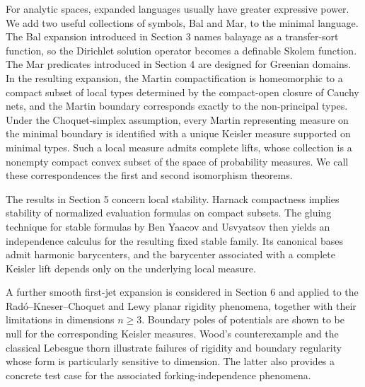 \documentclass{amsart}
\theoremstyle{definition}
\theoremstyle{remark}
\numberwithin{equation}{section}
\begin{document}
	For analytic spaces, expanded languages usually have greater expressive power. We add two useful collections of symbols, Bal and Mar, to the minimal language. The Bal expansion introduced in Section 3 names balayage as a transfer-sort function, so the Dirichlet solution operator becomes a definable Skolem function. The Mar predicates introduced in Section 4 are designed for Greenian domains. In the resulting expansion, the Martin compactification is homeomorphic to a compact subset of local types determined by the compact-open closure of Cauchy nets, and the Martin boundary corresponds exactly to the non-principal types. Under the Choquet-simplex assumption, every Martin representing measure on the minimal boundary is identified with a unique Keisler measure supported on minimal types. Such a local measure admits complete lifts, whose collection is a nonempty compact convex subset of the space of probability measures. We call these correspondences the first and second isomorphism theorems.
	
	The results in Section 5 concern local
	stability. Harnack compactness implies stability of normalized evaluation formulas on compact subsets. The gluing technique for stable formulas by Ben Yaacov and Usvyatsov \cite{Yaacov2008CONTINUOUSFO} then yields an
	independence calculus for the resulting fixed stable family. Its
	canonical bases admit harmonic barycenters, and the barycenter
	associated with a complete Keisler lift depends only on the underlying local measure.
	
	
	A further smooth first-jet expansion is considered in Section 6 and applied to the Rad\'o--Kneser--Choquet and Lewy planar rigidity phenomena, together with their limitations in dimensions $n\ge3$. Boundary poles of potentials are shown to be null for the
	corresponding Keisler measures. Wood's counterexample and the classical Lebesgue thorn illustrate failures of rigidity and boundary regularity whose form is particularly sensitive to dimension. The latter also provides a concrete test case for the associated forking-independence phenomena.
	
	
	
	
	
\end{document}
